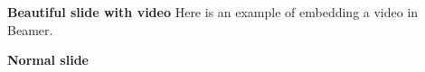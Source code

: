 \documentclass[aspectratio=169,10pt]{beamer}
\author{\getStudentName}
\date{October 10, 2023}
\begin{document}

\begin{frame}{\textbf{Beautiful slide with video}}
	Here is an example of embedding a video in Beamer.
	\begin{center}
	\end{center}
\end{frame}

\begin{frame}{\textbf{Normal slide}}
	
\end{frame}

\end{document}
